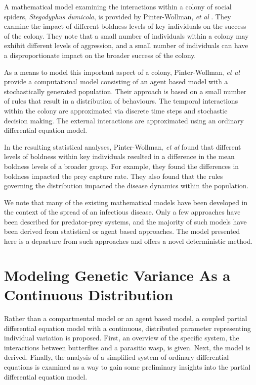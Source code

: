 \documentclass[review]{elsarticle}
\begin{document}
A mathematical model examining the interactions within a colony of
social spiders, \textit{Stegodyphus dumicola}, is provided by
Pinter-Wollman, \textit{et al} \cite{doi:10.1086/687235}. They  examine the impact of different boldness levels of
 key individuals on the success of the colony.  They note that a small number of individuals within
a colony may exhibit different levels of aggression, and a small
number of individuals can have a disproportionate impact on the
broader success of the colony.

As a means to model this important aspect of a colony, Pinter-Wollman,
\textit{et al}\cite{doi:10.1086/687235} provide a computational model
consisting of an agent based model with a stochastically generated
population. Their approach is based on a small number of rules that
result in a distribution of behaviours. The temporal interactions
within the colony are approximated via discrete time steps and
stochastic decision making. The external interactions are approximated
using an ordinary differential equation model.

In the resulting statistical analyses, Pinter-Wollman, \textit{et
  al} \cite{doi:10.1086/687235} found that different levels of boldness
within key individuals resulted in a difference in the mean boldness
levels of a broader group. For example, they found the differences in
boldness impacted the prey capture rate. They also found that
the rules governing the distribution impacted the disease dynamics within the
population.

We note that many of the existing mathematical models have been
developed in the context of the spread of an infectious disease. Only
a few approaches have been described for predator-prey systems, and
the majority of such models have been derived from statistical or
agent based approaches. The model presented here is a departure from
such approaches and offers a novel deterministic method.


\section{Modeling Genetic Variance As a Continuous Distribution}

Rather than  a compartmental model or an agent based model, a
coupled partial differential equation model with a continuous, distributed parameter representing individual variation  is proposed. First, an overview of the specific system, the interactions
between butterflies and a parasitic wasp, is given. Next, the
model is derived. Finally, the analysis of a simplified system of
ordinary differential equations is examined as a way to gain some
preliminary insights into the partial differential equation model.
\end{document}
